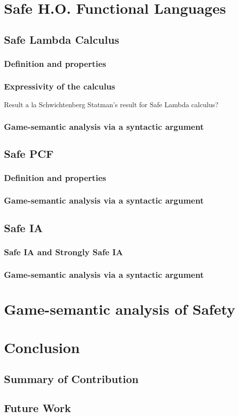 \chapter{Safe H.O. Functional Languages}

    \section{Safe Lambda Calculus}
        \subsection{Definition and properties}
        \subsection{Expressivity of the calculus}
        Result a la Schwichtenberg \cite{citeulike:622637}
        Statman's result for Safe Lambda calculus?

        \subsection{Game-semantic analysis via a syntactic argument}
    \section{Safe PCF}
        \subsection{Definition and properties}
        \subsection{Game-semantic analysis via a syntactic argument}

    \section{Safe IA}
        \subsection{Safe IA and Strongly Safe IA}
        \subsection{Game-semantic analysis via a syntactic argument}


\chapter{Game-semantic analysis of Safety}

    



\chapter{Conclusion}
\section{Summary of Contribution}
\section{Future Work}

 